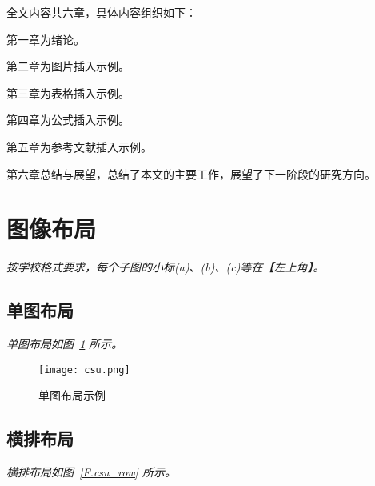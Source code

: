 全文内容共六章，具体内容组织如下：

第一章为绪论。

第二章为图片插入示例。

第三章为表格插入示例。

第四章为公式插入示例。

第五章为参考文献插入示例。

第六章总结与展望，总结了本文的主要工作，展望了下一阶段的研究方向。

\newpage

\section{图像布局}
\label{sec.figure}
\emph{按学校格式要求，每个子图的小标(a)、(b)、(c)等在【左上角】。}

\subsection{单图布局}

\lipsum

\emph{单图布局如图~\ref{F.csu_single} 所示。}

\begin{figure}[hbt]
\centering
\texttt{[image: csu.png]}
\caption{单图布局示例}
\label{F.csu_single}
\end{figure}

\subsection{横排布局}

\emph{横排布局如图~\ref{F.csu_row} 所示。}

